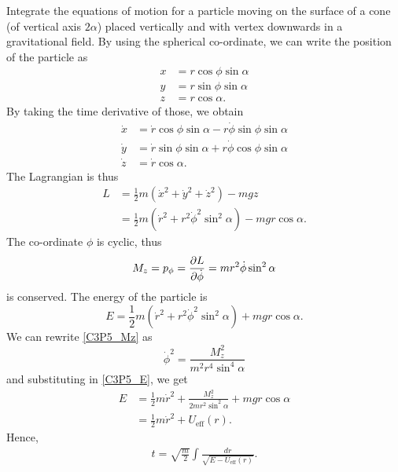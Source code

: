 \begin{problem}
{
Integrate the equations of motion for a particle moving on the surface of a cone (of vertical axis $2\alpha$) placed vertically and with vertex downwards in a gravitational field.
}
{
By using the  spherical co-ordinate, we can write the position of the particle as 
\begin{align*}
    x &= r\cos{\phi}\sin{\alpha} \\
    y &= r\sin{\phi}\sin{\alpha} \\
    z &= r\cos{\alpha}.
\end{align*}
By taking the time derivative of those, we obtain
\begin{align*}
    \Dot{x} &= \Dot{r}\cos{\phi}\sin{\alpha} - r\Dot{\phi}\sin{\phi}\sin{\alpha} \\
    \Dot{y} &= \Dot{r}\sin{\phi}\sin{\alpha} + r\Dot{\phi}\cos{\phi}\sin{\alpha} \\
    \Dot{z} &= \Dot{r}\cos{\alpha}.
\end{align*}
The Lagrangian is thus
\begin{align*}
    L &= \frac{1}{2}m\left( \Dot{x}^2 + \Dot{y}^2 + \Dot{z}^2 \right) - mgz \\
    &= \frac{1}{2}m\left( \Dot{r}^2 + r^2\Dot{\phi}^2\sin^2{\alpha} \right) -mgr\cos{\alpha} .
\end{align*}
The co-ordinate $\phi$ is cyclic, thus 
\begin{equation} \label{C3P5_Mz}
    M_z = p_{\phi} = \frac{\partial L}{\partial \Dot{\phi}} = mr^2\Dot{\phi}\sin^2{\alpha}
\end{equation}
is conserved. The energy of the particle is
\begin{equation} \label{C3P5_E}
    E = \frac{1}{2}m\left( \Dot{r}^2 + r^2\Dot{\phi}^2\sin^2{\alpha} \right) + mgr\cos{\alpha} .
\end{equation}
We can rewrite \eqref{C3P5_Mz} as
\begin{equation*}
    \Dot{\phi}^2 =  \frac{M_z^2}{m^2r^4\sin^4{\alpha}}
\end{equation*}
and substituting in \eqref{C3P5_E}, we get
\begin{align*}
    E &= \frac{1}{2}m\Dot{r}^2 + \frac{M_z^2}{2mr^2\sin^2{\alpha}} + mgr\cos{\alpha} \\
    &= \frac{1}{2}m\Dot{r}^2 + U_{\text{eff}}(r).
\end{align*}
Hence,
\begin{align*}
    t = \sqrt{\frac{m}{2}} \int \frac{dr}{\sqrt{E-U_{\text{eff}}(r)}}.
\end{align*}
}
\end{problem}
